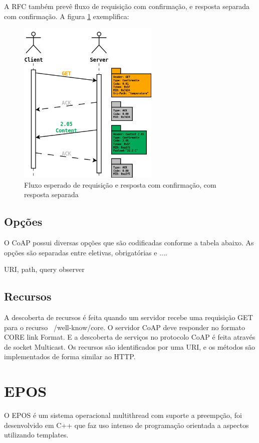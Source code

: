 A RFC tamb\'em prev\^e fluxo de requisi\c{c}\~ao com confirma\c{c}\~ao, e resposta separada com confirma\c{c}\~ao. A figura \ref{separateResponse} exemplifica:

\begin{figure}[h]
   \label{separateResponse}
   \centering
   \includegraphics[width=0.6\textwidth]{figuras/separateresponse.png}
   \caption{Fluxo esperado de requisi\c{c}\~ao e resposta com confirma\c{c}\~ao, com resposta separada}
\end{figure}

\subsection{Op\c{c}\~oes}

O CoAP possui diversas op\c{c}\~oes que s\~ao codificadas conforme a tabela abaixo.
As op\c{c}\~oes s\~ao separadas entre eletivas, obrigat\'orias e ....

URI, path, query
observer


\subsection{Recursos}

A descoberta de recursos \'e feita quando um servidor recebe uma requisi\c{c}\~ao GET para o recurso ~/well-know/core. O servidor CoAP deve responder no formato CORE link Format.\cite{rfc6690} E a descoberta de servi\c{c}os no protocolo CoAP \'e feita atrav\'es de socket Multicast. Os recursos s\~ao identificados por uma URI, e os m\'etodos s\~ao implementados de forma similar ao HTTP.  
\section{EPOS}
O EPOS \'e um sistema operacional multithread com suporte a preemp\c{c}\~ao, foi desenvolvido em C++ que faz uso intenso de programa\c{c}\~ao orientada a aspectos utilizando templates.


